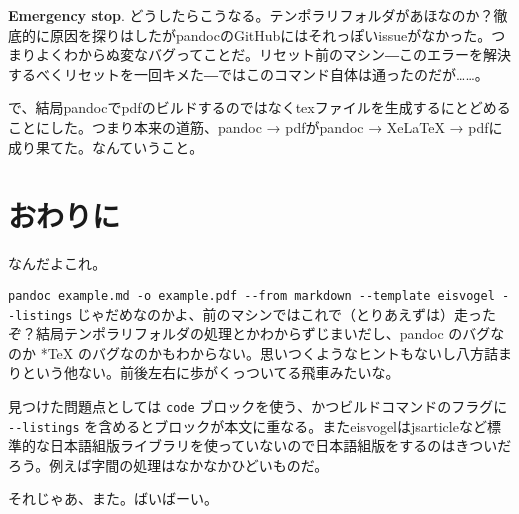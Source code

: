 \documentclass[
  a4paper,
,tablecaptionabove
]{scrartcl}
\begin{document}
\textbf{Emergency stop}.
どうしたらこうなる。テンポラリフォルダがあほなのか？徹底的に原因を探りはしたがpandocのGitHubにはそれっぽいissueがなかった。つまりよくわからぬ変なバグってことだ。リセット前のマシン―このエラーを解決するべくリセットを一回キメた―ではこのコマンド自体は通ったのだが\ldots\ldots。

で、結局pandocでpdfのビルドするのではなくtexファイルを生成するにとどめることにした。つまり本来の道筋、pandoc
→ pdfがpandoc → XeLaTeX → pdfに成り果てた。なんていうこと。

\hypertarget{ux304aux308fux308aux306b}{%
\section{おわりに}\label{ux304aux308fux308aux306b}}

なんだよこれ。

\texttt{pandoc\ example.md\ -o\ example.pdf\ -\/-from\ markdown\ -\/-template\ eisvogel\ -\/-listings}
じゃだめなのかよ、前のマシンではこれで（とりあえずは）走ったぞ？結局テンポラリフォルダの処理とかわからずじまいだし、pandoc
のバグなのか *TeX
のバグなのかもわからない。思いつくようなヒントもないし八方詰まりという他ない。前後左右に歩がくっついてる飛車みたいな。

見つけた問題点としては \texttt{code}
ブロックを使う、かつビルドコマンドのフラグに \texttt{-\/-listings}
を含めるとブロックが本文に重なる。またeisvogelはjsarticleなど標準的な日本語組版ライブラリを使っていないので日本語組版をするのはきついだろう。例えば字間の処理はなかなかひどいものだ。

それじゃあ、また。ばいばーい。
\end{document}
